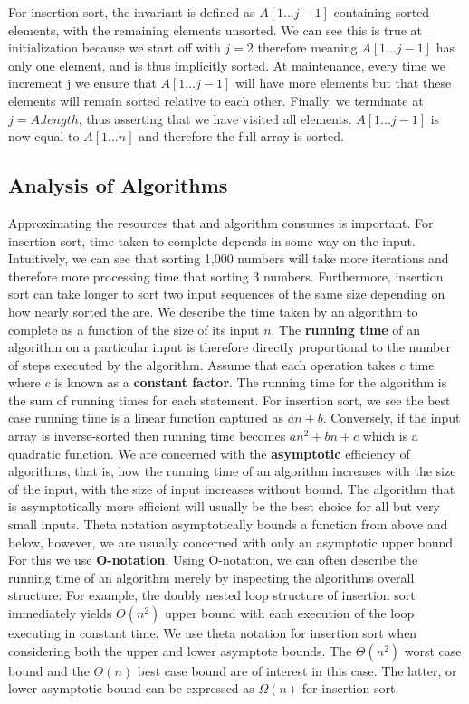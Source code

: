 \documentclass[10pt,a4paper]{article}
\begin{document}
\newline\newline
For insertion sort, the invariant is defined as $A[1...j-1]$ containing sorted elements, with the remaining elements unsorted. We can see this is true at initialization because we start off with $j=2$ therefore meaning $A[1...j-1]$ has only one element, and is thus implicitly sorted. At maintenance, every time we increment j we ensure that $A[1...j-1]$ will have more elements but that these elements will remain sorted relative to each other. Finally, we terminate at $j = A.length$, thus asserting that we have visited all elements. $A[1...j-1]$ is now equal to $A[1...n]$ and therefore the full array is sorted. 
\subsection{Analysis of Algorithms}
Approximating the resources that and algorithm consumes is important. For insertion sort, time taken to complete depends in some way on the input. Intuitively, we can see that sorting 1,000 numbers will take more iterations and therefore more processing time that sorting 3 numbers. Furthermore, insertion sort can take longer to sort two input sequences of the same size depending on how nearly sorted the are. We describe the time taken by an algorithm to complete as a function of the size of its input $n$. The {\bf running time} of an algorithm on a particular input is therefore directly proportional to the number of steps executed by the algorithm. Assume that each operation takes $c$ time where $c$ is known as a {\bf constant factor}. The running time for the algorithm is the sum of running times for each statement. For insertion sort, we see the best case running time is a linear function captured as $an + b$. Conversely, if the input array is inverse-sorted then running time becomes $an^2+bn+c$ which is a quadratic function.
\newline\newline
We are concerned with the {\bf asymptotic} efficiency of algorithms, that is, how the running time of an algorithm increases with the size of the input, with the size of input increases without bound. The algorithm that is asymptotically more efficient will usually be the best choice for all but very small inputs. Theta notation asymptotically bounds a function from above and below, however, we are usually concerned with only an asymptotic upper bound. For this we use {\bf O-notation}. Using O-notation, we can often describe the running time of an algorithm merely by inspecting the algorithms overall structure. For example, the doubly nested loop structure of insertion sort immediately yields $O(n^2)$ upper bound with each execution of the loop executing in constant time. We use theta notation for insertion sort when considering both the upper and lower asymptote bounds. The $\Theta(n^2)$ worst case bound and the $\Theta(n)$ best case bound are of interest in this case. The latter, or lower asymptotic bound can be expressed as $\Omega(n)$ for insertion sort. 
\end{document}
